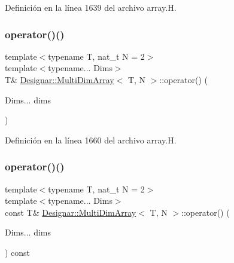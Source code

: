 Definición en la línea 1639 del archivo array.\+H.

\mbox{\label{class_designar_1_1_multi_dim_array_a9547e76013b4f532de026ec425ad4f7a}} 
\subsubsection{\texorpdfstring{operator()()}{operator()()}\hspace{0.1cm}{\footnotesize\ttfamily [1/2]}}
{\footnotesize\ttfamily template$<$typename T, nat\+\_\+t N = 2$>$ \\
template$<$typename... Dims$>$ \\
T\& \hyperlink{class_designar_1_1_multi_dim_array}{Designar\+::\+Multi\+Dim\+Array}$<$ T, N $>$\+::operator() (\begin{DoxyParamCaption}\item[{Dims...}]{dims }\end{DoxyParamCaption})\hspace{0.3cm}{\ttfamily [inline]}}



Definición en la línea 1660 del archivo array.\+H.

\mbox{\label{class_designar_1_1_multi_dim_array_a1edce0b31104f2b50bd8f8047e373b78}} 
\subsubsection{\texorpdfstring{operator()()}{operator()()}\hspace{0.1cm}{\footnotesize\ttfamily [2/2]}}
{\footnotesize\ttfamily template$<$typename T, nat\+\_\+t N = 2$>$ \\
template$<$typename... Dims$>$ \\
const T\& \hyperlink{class_designar_1_1_multi_dim_array}{Designar\+::\+Multi\+Dim\+Array}$<$ T, N $>$\+::operator() (\begin{DoxyParamCaption}\item[{Dims...}]{dims }\end{DoxyParamCaption}) const\hspace{0.3cm}{\ttfamily [inline]}}



